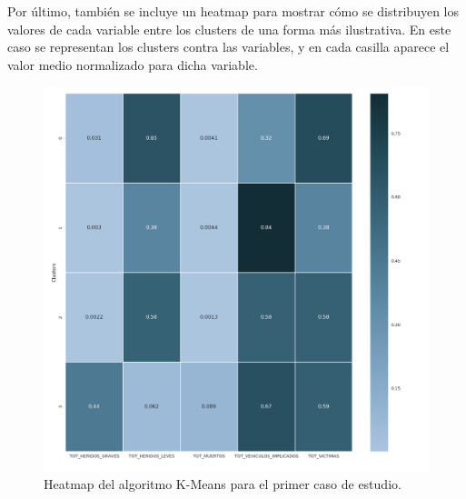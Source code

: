 	\begin{table}[H]
		\centering
		\caption{Tabla de valores medios del algoritmo K-Means para el primer caso de estudio.}
	\end{table}
	
	Por último, también se incluye un heatmap para mostrar cómo se distribuyen los valores de cada variable entre los clusters de una forma más ilustrativa. En este caso se representan los clusters contra las variables, y en cada casilla aparece el valor medio normalizado para dicha variable.
	
	\begin{figure}[H]
		\centering
		\includegraphics[scale=0.4]{heatmaps/K-Means-HighwayAccidents-Heatmap.png}
		\caption{Heatmap del algoritmo K-Means para el primer caso de estudio.}
	\end{figure}

